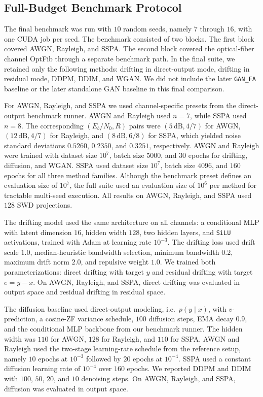 \subsection{Full-Budget Benchmark Protocol}
The final benchmark was run with $10$ random seeds, namely $7$ through $16$, with one CUDA job per seed. The benchmark consisted of two blocks. The first block covered AWGN, Rayleigh, and SSPA. The second block covered the optical-fiber channel OptFib through a separate benchmark path. In the final suite, we retained only the following methods: drifting in direct-output mode, drifting in residual mode, DDPM, DDIM, and WGAN. We did not include the later \texttt{GAN\_FA} baseline or the later standalone GAN baseline in this final comparison.

For AWGN, Rayleigh, and SSPA we used channel-specific presets from the direct-output benchmark runner. AWGN and Rayleigh used $n=7$, while SSPA used $n=8$. The corresponding $(E_b/N_0, R)$ pairs were $(5\,\mathrm{dB}, 4/7)$ for AWGN, $(12\,\mathrm{dB}, 4/7)$ for Rayleigh, and $(8\,\mathrm{dB}, 6/8)$ for SSPA, which yielded noise standard deviations $0.5260$, $0.2350$, and $0.3251$, respectively. AWGN and Rayleigh were trained with dataset size $10^7$, batch size $5000$, and $30$ epochs for drifting, diffusion, and WGAN. SSPA used dataset size $10^7$, batch size $4096$, and $160$ epochs for all three method families. Although the benchmark preset defines an evaluation size of $10^7$, the full suite used an evaluation size of $10^6$ per method for tractable multi-seed execution. All results on AWGN, Rayleigh, and SSPA used $128$ SWD projections.

The drifting model used the same architecture on all channels: a conditional MLP with latent dimension $16$, hidden width $128$, two hidden layers, and \texttt{SiLU} activations, trained with Adam at learning rate $10^{-3}$. The drifting loss used drift scale $1.0$, median-heuristic bandwidth selection, minimum bandwidth $0.2$, maximum drift norm $2.0$, and repulsive weight $1.0$. We trained both parameterizations: direct drifting with target $y$ and residual drifting with target $e=y-x$. On AWGN, Rayleigh, and SSPA, direct drifting was evaluated in output space and residual drifting in residual space.

The diffusion baseline used direct-output modeling, i.e.\ $p(y\mid x)$, with $v$-prediction, a cosine-ZF variance schedule, $100$ diffusion steps, EMA decay $0.9$, and the conditional MLP backbone from our benchmark runner. The hidden width was $110$ for AWGN, $128$ for Rayleigh, and $110$ for SSPA. AWGN and Rayleigh used the two-stage learning-rate schedule from the reference setup, namely $10$ epochs at $10^{-3}$ followed by $20$ epochs at $10^{-4}$. SSPA used a constant diffusion learning rate of $10^{-4}$ over $160$ epochs. We reported DDPM and DDIM with $100$, $50$, $20$, and $10$ denoising steps. On AWGN, Rayleigh, and SSPA, diffusion was evaluated in output space.

